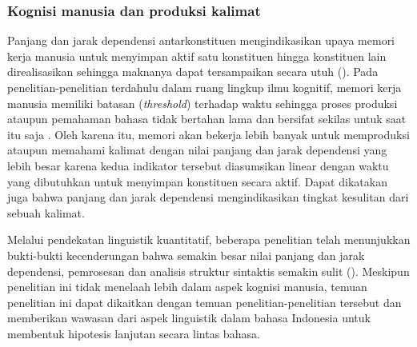 \subsubsection{Kognisi manusia dan produksi kalimat}
Panjang dan jarak dependensi antarkonstituen mengindikasikan upaya memori kerja manusia untuk menyimpan aktif satu konstituen hingga konstituen lain direalisasikan sehingga maknanya dapat tersampaikan secara utuh (\citealp{hudson2003psychological, liu2008dependency}). Pada penelitian-penelitian terdahulu dalam ruang lingkup ilmu kognitif, memori kerja manusia memiliki batasan (\textit{threshold}) terhadap waktu sehingga proses produksi ataupun pemahaman bahasa tidak bertahan lama dan bersifat sekilas untuk saat itu saja \citep{christiansen2016now}. Oleh karena itu, memori akan bekerja lebih banyak untuk memproduksi ataupun memahami kalimat dengan nilai panjang dan jarak dependensi yang lebih besar karena kedua indikator tersebut diasumsikan linear dengan waktu yang dibutuhkan untuk menyimpan konstituen secara aktif. Dapat dikatakan juga bahwa panjang dan jarak dependensi mengindikasikan tingkat kesulitan dari sebuah kalimat. 

Melalui pendekatan linguistik kuantitatif, beberapa penelitian telah menunjukkan bukti-bukti kecenderungan bahwa semakin besar nilai panjang dan jarak dependensi, pemrosesan dan analisis struktur sintaktis semakin sulit (\citealp{gibson1998linguistic, hiranuma1999syntactic, jiang2015effects, temperley2007minimization}). Meskipun penelitian ini tidak menelaah lebih dalam aspek kognisi manusia, temuan penelitian ini dapat dikaitkan dengan temuan penelitian-penelitian tersebut dan memberikan wawasan dari aspek linguistik dalam bahasa Indonesia untuk membentuk hipotesis lanjutan secara lintas bahasa.

